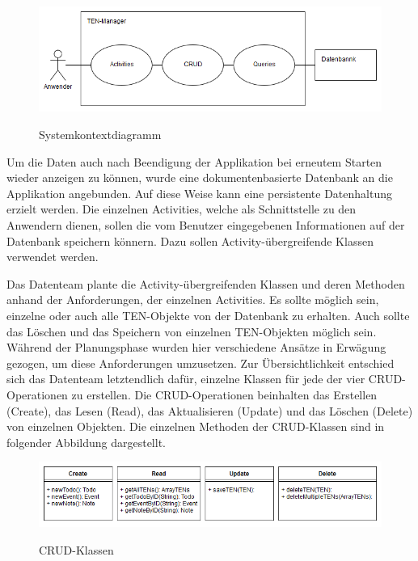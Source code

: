 \begin{figure}[H]
\centering
\begin{minipage}[t]{1\textwidth} %
\caption{Systemkontextdiagramm} %
\includegraphics[width=1\textwidth]{img/Systemkontextdiagramm}\\ %
\end{minipage}
\end{figure}

Um die Daten auch nach Beendigung der Applikation bei erneutem Starten wieder anzeigen zu können, wurde eine dokumentenbasierte Datenbank an die Applikation angebunden. Auf diese Weise kann eine persistente Datenhaltung erzielt werden. Die einzelnen Activities, welche als Schnittstelle zu den Anwendern dienen, sollen die vom Benutzer eingegebenen Informationen auf der Datenbank speichern könnern. Dazu sollen Activity-übergreifende Klassen verwendet werden.

Das Datenteam plante die Activity-übergreifenden Klassen und deren Methoden anhand der Anforderungen, der einzelnen Activities. Es sollte möglich sein, einzelne oder auch alle TEN-Objekte von der Datenbank zu erhalten. Auch sollte das Löschen und das Speichern von einzelnen TEN-Objekten möglich sein. Während der Planungsphase wurden hier verschiedene Ansätze in Erwägung gezogen, um diese Anforderungen umzusetzen. Zur Übersichtlichkeit entschied sich das Datenteam letztendlich dafür, einzelne Klassen für jede der vier CRUD-Operationen zu erstellen. Die CRUD-Operationen beinhalten das Erstellen (Create), das Lesen (Read), das Aktualisieren (Update) und das Löschen (Delete) von einzelnen Objekten. Die einzelnen Methoden der CRUD-Klassen sind in folgender Abbildung dargestellt.

\begin{figure}[H]
\centering
\begin{minipage}[t]{1\textwidth} %
\caption{CRUD-Klassen} %
\includegraphics[width=1\textwidth]{img/CRUD-Klassen}\\ %
\end{minipage}
\end{figure}

